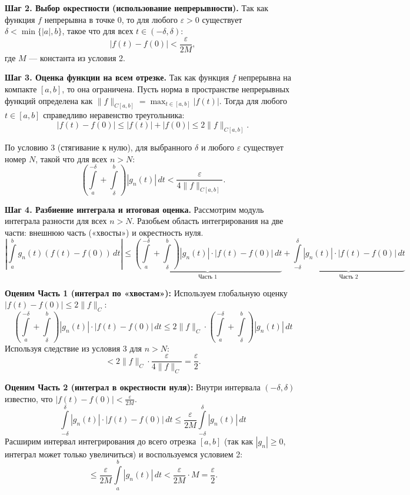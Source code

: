 \documentclass[12pt,a4paper,openany]{book}
\begin{document}
\textbf{Шаг 2. Выбор окрестности (использование непрерывности).}
Так как функция $f$ непрерывна в точке 0, то для любого $\varepsilon > 0$ существует $\delta < \min\{|a|, b\}$, такое что для всех $t \in (-\delta, \delta)$:
\[
|f(t) - f(0)| < \frac{\varepsilon}{2M},
\]
где $M$ — константа из условия 2.

\textbf{Шаг 3. Оценка функции на всем отрезке.}
Так как функция $f$ непрерывна на компакте $[a, b]$, то она ограничена. Пусть норма в пространстве непрерывных функций определена как $\|f\|_{C[a,b]} = \max_{t \in [a,b]} |f(t)|$.
Тогда для любого $t \in [a, b]$ справедливо неравенство треугольника:
\[
|f(t) - f(0)| \le |f(t)| + |f(0)| \le 2\|f\|_{C[a,b]}.
\]

По условию 3 (стягивание к нулю), для выбранного $\delta$ и любого $\varepsilon$ существует номер $N$, такой что для всех $n > N$:
\[
\left( \int\limits_{a}^{-\delta} + \int\limits_{\delta}^{b} \right) |g_n(t)|\,dt < \frac{\varepsilon}{4\|f\|_{C[a,b]}}.
\]

\textbf{Шаг 4. Разбиение интеграла и итоговая оценка.}
Рассмотрим модуль интеграла разности для всех $n > N$. Разобьем область интегрирования на две части: внешнюю часть («хвосты») и окрестность нуля.
\[
\left| \int\limits_{a}^{b} g_n(t)(f(t) - f(0))\,dt \right| \le 
\underbrace{\left( \int\limits_{a}^{-\delta} + \int\limits_{\delta}^{b} \right) |g_n(t)| \cdot |f(t) - f(0)|\,dt}_{\text{Часть 1}} + 
\underbrace{\int\limits_{-\delta}^{\delta} |g_n(t)| \cdot |f(t) - f(0)|\,dt}_{\text{Часть 2}}
\]

\textbf{Оценим Часть 1 (интеграл по «хвостам»):}
Используем глобальную оценку $|f(t) - f(0)| \le 2\|f\|_C$:
\[
\left( \int\limits_{a}^{-\delta} + \int\limits_{\delta}^{b} \right) |g_n(t)| \cdot |f(t) - f(0)|\,dt \le 2\|f\|_C \cdot \left( \int\limits_{a}^{-\delta} + \int\limits_{\delta}^{b} \right) |g_n(t)|\,dt
\]
Используя следствие из условия 3 для $n > N$:
\[
< 2\|f\|_C \cdot \frac{\varepsilon}{4\|f\|_C} = \frac{\varepsilon}{2}.
\]

\textbf{Оценим Часть 2 (интеграл в окрестности нуля):}
Внутри интервала $(-\delta, \delta)$ известно, что $|f(t) - f(0)| < \frac{\varepsilon}{2M}$.
\[
\int\limits_{-\delta}^{\delta} |g_n(t)| \cdot |f(t) - f(0)|\,dt \le \frac{\varepsilon}{2M} \int\limits_{-\delta}^{\delta} |g_n(t)|\,dt
\]
Расширим интервал интегрирования до всего отрезка $[a, b]$ (так как $|g_n| \ge 0$, интеграл может только увеличиться) и воспользуемся условием 2:
\[
\le \frac{\varepsilon}{2M} \int\limits_{a}^{b} |g_n(t)|\,dt < \frac{\varepsilon}{2M} \cdot M = \frac{\varepsilon}{2}.
\]
\end{document}
